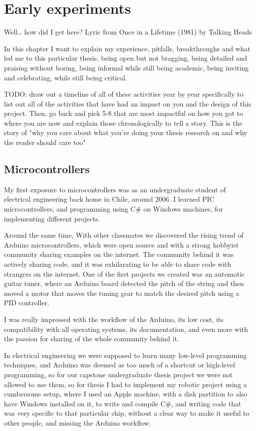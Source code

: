 \chapter{Early experiments}

Well… how did I get here?
Lyric from Once in a Lifetime (1981) by Talking Heads

In this chapter I want to explain my experience, pitfalls, breakthroughs and what led me to this particular thesis, being open but not bragging, being detailed and praising without boring, being informal while still being academic, being inviting and celebrating, while still being critical.

TODO: draw out a timeline of all of these activities year by year specifically to list out all of the activities that have had an impact on you and the design of this project.
Then, go back and pick 5-8 that are most impactful on how you got to where you are now and explain those chronologically to tell a story. This is the story of "why you care about what you're doing your thesis research on and why the reader should care too"

\section{Microcontrollers}

My first exposure to microcontrollers was as an undergraduate student of electrical engineering back home in Chile, around 2006. I learned PIC microcontrollers, and programming using C\# on Windows machines, for implementing different projects.

Around the same time, With other classmates we discovered the rising trend of Arduino microcontrollers, which were open source and with a strong hobbyist community sharing examples on the internet. The community behind it was actively sharing code, and it was exhilarating to be able to share code with strangers on the internet. One of the first projects we created was an automatic guitar tuner, where an Arduino board detected the pitch of the string and then moved a motor that moves the tuning gear to match the desired pitch using a PID controller.

I was really impressed with the workflow of the Arduino, its low cost, its compatibility with all operating systems, its documentation, and even more with the passion for sharing of the whole community behind it.

In electrical engineering we were supposed to learn many low-level programming techniques, and Arduino was deemed as too much of a shortcut or high-level programming, so for our capstone undergraduate thesis project we were not allowed to use them, so for thesis I had to implement my robotic project using a cumbersome setup, where I used an Apple machine, with a disk partition to also have Windows installed on it, to write and compile C\#, and writing code that was very specific to that particular chip, without a clear way to make it useful to other people, and missing the Arduino workflow.

